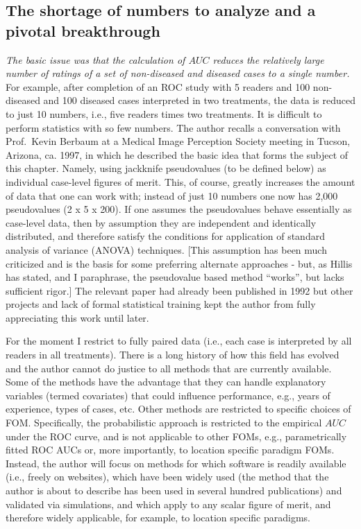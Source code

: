 \documentclass[
]{book}
\begin{document}
\hypertarget{the-shortage-of-numbers-to-analyze-and-a-pivotal-breakthrough}{%
\subsection{The shortage of numbers to analyze and a pivotal breakthrough}\label{the-shortage-of-numbers-to-analyze-and-a-pivotal-breakthrough}}

\emph{The basic issue was that the calculation of \(AUC\) reduces the relatively large number of ratings of a set of non-diseased and diseased cases to a single number.} For example, after completion of an ROC study with 5 readers and 100 non-diseased and 100 diseased cases interpreted in two treatments, the data is reduced to just 10 numbers, i.e., five readers times two treatments. It is difficult to perform statistics with so few numbers. The author recalls a conversation with Prof.~Kevin Berbaum at a Medical Image Perception Society meeting in Tucson, Arizona, ca. 1997, in which he described the basic idea that forms the subject of this chapter. Namely, using jackknife pseudovalues (to be defined below) as individual case-level figures of merit. This, of course, greatly increases the amount of data that one can work with; instead of just 10 numbers one now has 2,000 pseudovalues (2 x 5 x 200). If one assumes the pseudovalues behave essentially as case-level data, then by assumption they are independent and identically distributed, and therefore satisfy the conditions for application of standard analysis of variance (ANOVA) techniques. {[}This assumption has been much criticized and is the basis for some preferring alternate approaches - but, as Hillis has stated, and I paraphrase, the pseudovalue based method ``works'', but lacks sufficient rigor.{]} The relevant paper had already been published in 1992 but other projects and lack of formal statistical training kept the author from fully appreciating this work until later.

For the moment I restrict to fully paired data (i.e., each case is interpreted by all readers in all treatments). There is a long history of how this field has evolved and the author cannot do justice to all methods that are currently available. Some of the methods \citep{RN1441, RN2013, RN1451} have the advantage that they can handle explanatory variables (termed covariates) that could influence performance, e.g., years of experience, types of cases, etc. Other methods are restricted to specific choices of FOM. Specifically, the probabilistic approach \citep{RN2253, RN2254, RN2351, RN2080} is restricted to the empirical \(AUC\) under the ROC curve, and is not applicable to other FOMs, e.g., parametrically fitted ROC AUCs or, more importantly, to location specific paradigm FOMs. Instead, the author will focus on methods for which software is readily available (i.e., freely on websites), which have been widely used (the method that the author is about to describe has been used in several hundred publications) and validated via simulations, and which apply to any scalar figure of merit, and therefore widely applicable, for example, to location specific paradigms.
\end{document}
